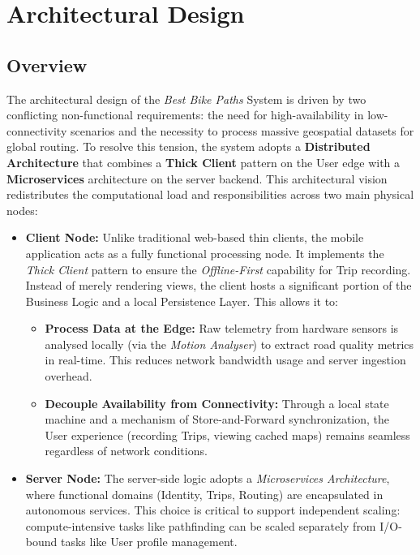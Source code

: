 \chapter{Architectural Design}
\label{ch:architectural_design}
\section{Overview}
The architectural design of the \emph{Best Bike Paths} System is driven by two conflicting non-functional requirements: the need for high-availability in low-connectivity scenarios and the necessity to process massive geospatial datasets for global routing.
To resolve this tension, the system adopts a \textbf{Distributed Architecture} that combines a \textbf{Thick Client} pattern on the User edge with a \textbf{Microservices} architecture on the server backend.
This architectural vision redistributes the computational load and responsibilities across two main physical nodes:
\begin{itemize}
    \item \textbf{Client Node:}
    Unlike traditional web-based thin clients, the mobile application acts as a fully functional processing node. It implements the \emph{Thick Client} pattern to ensure the \emph{Offline-First} capability for Trip recording.
    Instead of merely rendering views, the client hosts a significant portion of the Business Logic and a local Persistence Layer. This allows it to:
    \begin{itemize}
        \item \textbf{Process Data at the Edge:} Raw telemetry from hardware sensors is analysed locally (via the \emph{Motion Analyser}) to extract road quality metrics in real-time. This reduces network bandwidth usage and server ingestion overhead.
        \item \textbf{Decouple Availability from Connectivity:} Through a local state machine and a mechanism of Store-and-Forward synchronization, the User experience (recording Trips, viewing cached maps) remains seamless regardless of network conditions.
    \end{itemize}
    \item \textbf{Server Node:}
    The server-side logic adopts a \emph{Microservices Architecture}, where functional domains (Identity, Trips, Routing) are encapsulated in autonomous services. This choice is critical to support independent scaling: compute-intensive tasks like pathfinding can be scaled separately from I/O-bound tasks like User profile management.
\end{itemize}

